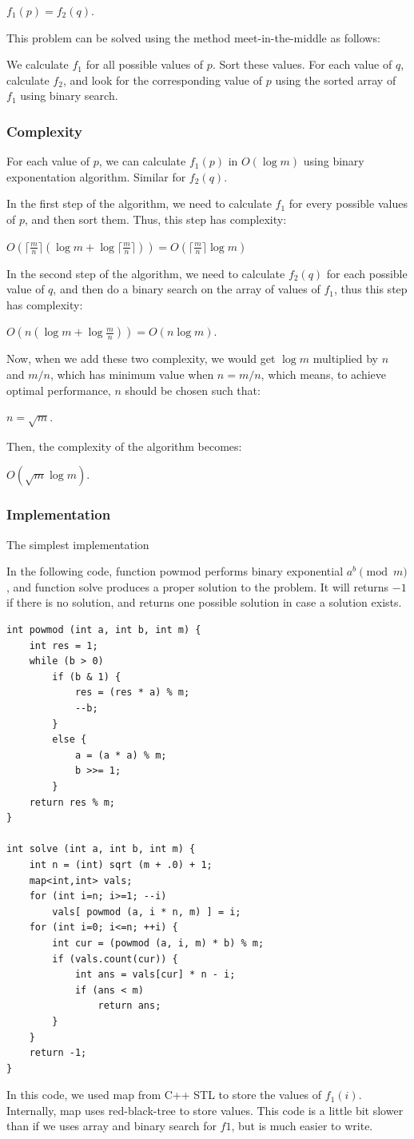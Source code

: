\documentclass[8pt, a4paper, oneside, twocolumn]{extarticle}
\begin{document}
$f_1(p) = f_2(q)$.

This problem can be solved using the method meet-in-the-middle as follows:

    We calculate $f_1$ for all possible values of $p$. Sort these values.
    For each value of $q$, calculate $f_2$, and look for the corresponding value of $p$ using the sorted array of $f_1$ using binary search.

\subsubsection{Complexity}

For each value of $p$, we can calculate $f_1(p)$ in $O(\log m)$ using binary exponentation algorithm. Similar for $f_2(q)$.

In the first step of the algorithm, we need to calculate $f_1$ for every possible values of $p$, and then sort them. Thus, this step has complexity:

$O(\lceil \frac{m}{n} \rceil (\log m + \log \lceil \frac{m}{n} \rceil )) = O( \lceil \frac {m}{n} \rceil \log m)$

In the second step of the algorithm, we need to calculate $f_2(q)$ for each possible value of $q$, and then do a binary search on the array of values of $f_1$, thus this step has complexity:

$O(n (\log m + \log \frac{m}{n} ) ) = O(n \log m)$.

Now, when we add these two complexity, we would get $\log m$ multiplied by $n$ and $m/n$, which has minimum value when $n = m/n$, which means, to achieve optimal performance, $n$ should be chosen such that:

$n = \sqrt{m}$.

Then, the complexity of the algorithm becomes:

$O(\sqrt {m} \log m)$.
\subsubsection{Implementation}
The simplest implementation

In the following code, function powmod performs binary exponential $a^b \pmod m$, and function solve produces a proper solution to the problem. It will returns $-1$ if there is no solution, and returns one possible solution in case a solution exists.
\begin{verbatim}
int powmod (int a, int b, int m) {
	int res = 1;
	while (b > 0)
		if (b & 1) {
			res = (res * a) % m;
			--b;
		}
		else {
			a = (a * a) % m;
			b >>= 1;
		}
	return res % m;
}
 
int solve (int a, int b, int m) {
	int n = (int) sqrt (m + .0) + 1;
	map<int,int> vals;
	for (int i=n; i>=1; --i)
		vals[ powmod (a, i * n, m) ] = i;
	for (int i=0; i<=n; ++i) {
		int cur = (powmod (a, i, m) * b) % m;
		if (vals.count(cur)) {
			int ans = vals[cur] * n - i;
			if (ans < m)
				return ans;
		}
	}
	return -1;
}
\end{verbatim}
In this code, we used map from C++ STL to store the values of $f_1 (i)$. Internally, map uses red-black-tree to store values. This code is a little bit slower than if we uses array and binary search for $f1$, but is much easier to write.
\end{document}
